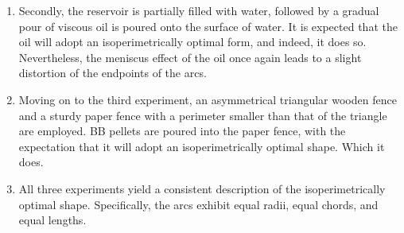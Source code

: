\documentclass[a4paper]{book}
\numberwithin{theorem}{section}%
\begin{document}
\begin{itemize}
\begin{enumerate}
        \item Secondly, the reservoir is partially filled with water, followed by a gradual pour of viscous oil is poured onto the surface of water. It is expected that the oil will adopt an isoperimetrically optimal form, and indeed, it does so. Nevertheless, the meniscus effect of the oil once again leads to a slight distortion of the endpoints of the arcs. 

        \item Moving on to the third experiment, an asymmetrical triangular wooden fence and a sturdy paper fence with a perimeter smaller than that of the triangle are employed. BB pellets are poured into the paper fence, with the expectation that it will adopt an isoperimetrically optimal shape. Which it does.

        \item All three experiments yield a consistent description of the isoperimetrically optimal shape. Specifically, the arcs exhibit equal radii, equal chords, and equal lengths.
    \end{enumerate}~\citep{garvin1975note}
    

\end{itemize}
\end{document}
